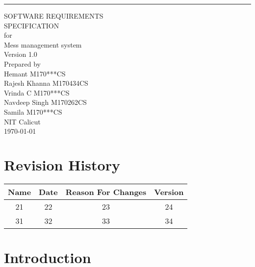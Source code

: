 \documentclass{scrreprt}
\date{}
\def\myversion{1.0 }
\begin{document}
\begin{flushright}
    \rule{16cm}{5pt}\vskip1cm
    \begin{bfseries}
        \Huge{SOFTWARE REQUIREMENTS\\ SPECIFICATION}\\
        \vspace{1.9cm}
        for\\
     Mess management system\\
       
        \LARGE{Version \myversion }\\
        \vspace{1.9cm}
        Prepared by\\ Hemant M170***CS\\
                    Rajesh Khanna M170434CS\\
                    Vrinda C M170***CS\\
                    Navdeep Singh M170262CS\\
                    Samila M170***CS\\
        \vspace{1.9cm}
        NIT Calicut\\
        \vspace{1.9cm}
        \today\\
    \end{bfseries}
\end{flushright}

\tableofcontents


\chapter*{Revision History}

\begin{center}
    \begin{tabular}{|c|c|c|c|}
        \hline
	    Name & Date & Reason For Changes & Version\\
        \hline
	    21 & 22 & 23 & 24\\
        \hline
	    31 & 32 & 33 & 34\\
        \hline
    \end{tabular}
\end{center}

\chapter{Introduction}
\end{document}

